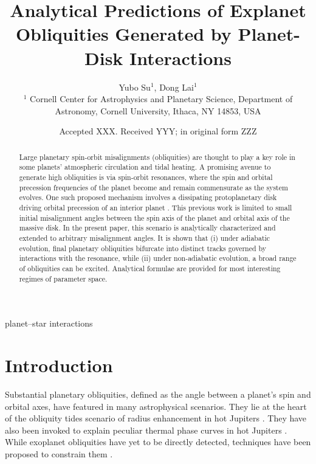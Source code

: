 \documentclass[
        fleqn,
        usenatbib,
        referee,
    ]{mnras}
\title[Analytical Exoplanet Obliquities]{Analytical Predictions of Explanet
Obliquities Generated by Planet-Disk Interactions}
\author[Y. Su et\ al.]{
Yubo Su$^1$,
Dong Lai$^1$
\\
$^1$ Cornell Center for Astrophysics and Planetary Science, Department of
Astronomy, Cornell University, Ithaca, NY 14853, USA
}
\date{Accepted XXX\@. Received YYY\@; in original form ZZZ}
\begin{document}
\label{firstpage}
\pagerange{\pageref{firstpage}--\pageref{lastpage}}
\renewcommand*{\sectionautorefname}{Section}
\maketitle

\begin{abstract}
    Large planetary spin-orbit misalignments (obliquities) are thought to play a
    key role in some planets' atmospheric circulation and tidal heating. A
    promising avenue to generate high obliquities is via spin-orbit resonances,
    where the spin and orbital precession frequencies of the planet become and
    remain commensurate as the system evolves. One such proposed mechanism
    involves a dissipating protoplanetary disk driving orbital precession of an
    interior planet \citep{millholland_disk}. This previous work is limited to
    small initial misalignment angles between the spin axis of the planet and
    orbital axis of the massive disk. In the present paper, this scenario is
    analytically characterized and extended to arbitrary misalignment angles. It
    is shown that (i) under adiabatic evolution, final planetary obliquities
    bifurcate into distinct tracks governed by interactions with the resonance,
    while (ii) under non-adiabatic evolution, a broad range of obliquities can
    be excited. Analytical formulae are provided for most interesting regimes of
    parameter space.
\end{abstract}

\begin{keywords}
planet--star interactions %
\end{keywords}

\section{Introduction}

Substantial planetary obliquities, defined as the angle between a planet's spin
and orbital axes, have featured in many astrophysical scenarios. They lie at the
heart of the obliquity tides scenario of radius enhancement in hot Jupiters
\citep{winn_otides, fabrycky_otides, millholland_wasp12b}. They have also been
invoked to explain peculiar thermal phase curves in hot Jupiters \citep[see
e.g.][]{millholland_signatures, ohno_infer_obl}. While exoplanet obliquities
have yet to be directly detected, techniques have been proposed to constrain
them \citep[see e.g.][]{schwarz_infer_obl, rauscher_infer_obl}.
\end{document}
